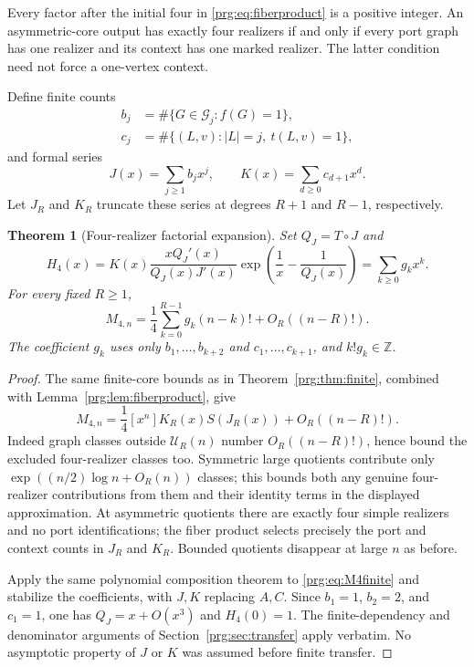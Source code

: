 \documentclass[11pt,letterpaper]{article}
\numberwithin{equation}{section}
\newtheorem{theorem}{Theorem}[section]
\theoremstyle{definition}\newtheorem{definition}[theorem]{Definition}
\theoremstyle{remark}\newtheorem{remark}[theorem]{Remark}
\newcommand{\ZZ}{\mathbb Z}
\begin{document}
Every factor after the initial four in \eqref{prg:eq:fiberproduct}
is a positive integer. An asymmetric-core output has exactly four
realizers if and only if every port graph has one realizer and
its context has one marked realizer. The latter condition need not
force a one-vertex context.

Define finite counts
\begin{align}\label{prg:eq:bc}
 b_j&=\#\{G\in\mathcal G_j:f(G)=1\},\\
 c_j&=\#\{(L,v):|L|=j,\ t(L,v)=1\},\nonumber
\end{align}
and formal series
\begin{equation}\label{prg:eq:JK}
 J(x)=\sum_{j\geq1}b_jx^j,\qquad
 K(x)=\sum_{d\geq0}c_{d+1}x^d.
\end{equation}
Let $J_R$ and $K_R$ truncate these series at degrees $R+1$ and
$R-1$, respectively.

\begin{theorem}[Four-realizer factorial expansion]\label{prg:thm:M4}
Set $Q_J=T\circ J$ and
\begin{equation}\label{prg:eq:H4}
 H_4(x)=K(x)\frac{xQ_J'(x)}{Q_J(x)J'(x)}
       \exp\left(\frac1x-\frac1{Q_J(x)}\right)
       =\sum_{k\geq0}g_kx^k.
\end{equation}
For every fixed $R\geq1$,
\begin{equation}\label{prg:eq:M4}
 M_{4,n}=\frac14\sum_{k=0}^{R-1}g_k(n-k)!
                   +O_R((n-R)!).
\end{equation}
The coefficient $g_k$ uses only $b_1,\ldots,b_{k+2}$ and
$c_1,\ldots,c_{k+1}$, and $k!g_k\in\ZZ$.
\end{theorem}
\begin{proof}
The same finite-core bounds as in Theorem~\ref{prg:thm:finite}, combined
with Lemma~\ref{prg:lem:fiberproduct}, give
\begin{equation}\label{prg:eq:M4finite}
 M_{4,n}=\frac14[x^n]K_R(x)S(J_R(x))+O_R((n-R)!).
\end{equation}
Indeed graph classes outside $\mathcal U_R(n)$ number
$O_R((n-R)!)$, hence bound the excluded four-realizer classes too.
Symmetric large quotients contribute only
$\exp((n/2)\log n+O_R(n))$ classes; this bounds both any genuine
four-realizer contributions from them and their identity terms in
the displayed approximation. At asymmetric quotients there are
exactly four simple realizers and no port identifications; the
fiber product selects precisely the port and context counts in
$J_R$ and $K_R$. Bounded quotients disappear at large $n$ as before.

Apply the same polynomial composition theorem to \eqref{prg:eq:M4finite}
and stabilize the coefficients, with $J,K$ replacing $A,C$.
Since $b_1=1$, $b_2=2$, and $c_1=1$, one has
$Q_J=x+O(x^3)$ and $H_4(0)=1$. The finite-dependency and denominator
arguments of Section~\ref{prg:sec:transfer} apply verbatim. No
asymptotic property of $J$ or $K$ was assumed before finite transfer.
\end{proof}
\end{document}
